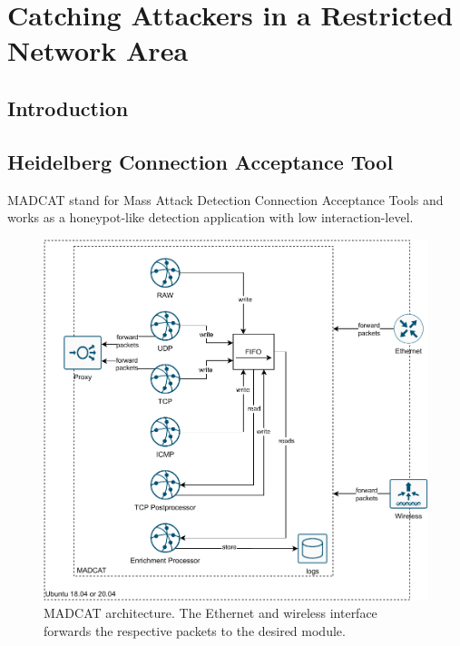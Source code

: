 \chapter{Catching Attackers in a Restricted Network Area}
\label{chap:concept}

\section{Introduction}

\section{Heidelberg Connection Acceptance Tool}

MADCAT stand for Mass Attack Detection Connection Acceptance Tools and works as a honeypot-like detection application with low interaction-level. 

\begin{figure}[ht]
    \centering
    \includegraphics[width=\textwidth]{figures/heicat-architecture.pdf}
    \caption[MADCAT architecture.]{MADCAT architecture. The Ethernet and wireless interface forwards the respective packets to the desired module.}
    \label{fig:heicat-architecture}
\end{figure}

